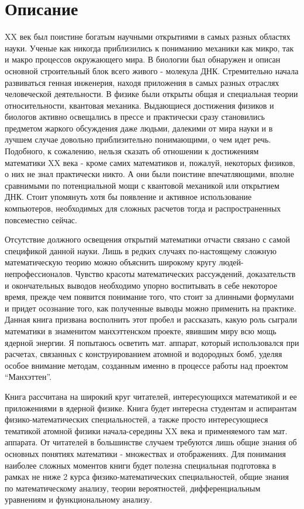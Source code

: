 \chapter*{Описание}

XX век был поистине богатым научными открытиями в самых разных областях науки. Ученые как никогда приблизились к пониманию механики как микро, так и макро процессов окружающего мира. В биологии был обнаружен и описан основной строительный блок всего живого - молекула ДНК. Стремительно начала развиваться генная инженерия, находя приложения в самых разных отраслях человеческой деятельности. В физике были открыты общая и специальная теории относительности, квантовая механика. Выдающиеся достижения физиков и биологов активно освещались в прессе и практически сразу становились предметом жаркого обсуждения даже людьми, далекими от мира науки и в лучшем случае довольно приблизительно понимающими, о чем идет речь. 
Подобного, к сожалению, нельзя сказать об отношении к достижениям математики XX века - кроме самих математиков и, пожалуй, некоторых физиков, о них не знал практически никто. А они были поистине впечатляющими, вполне сравнимыми по потенциальной мощи с квантовой механикой или открытием ДНК. Стоит упомянуть хотя бы появление и активное использование компьютеров, необходимых для сложных расчетов тогда и распространенных повсеместно сейчас.

Отсутствие должного освещения открытий математики отчасти связано с самой спецификой данной науки. Лишь в редких случаях по-настоящему сложную математическую теорию можно объяснить широкому кругу людей-непрофессионалов. Чувство красоты математических рассуждений, доказательств и окончательных выводов необходимо упорно воспитывать в себе некоторое время, прежде чем появится понимание того, что стоит за длинными формулами и придет осознание того, как полученные выводы можно применить на практике.
Данная книга призвана восполнить этот пробел и рассказать, какую роль сыграли математики в знаменитом манхэттенском проекте, явившим миру всю мощь ядерной энергии. Я попытаюсь осветить мат. аппарат, который использовался при расчетах, связанных с конструированием атомной и водородных бомб, уделяя особое внимание методам, созданным именно в процессе работы над проектом “Манхэттен”.

Книга рассчитана на широкий круг читателей, интересующихся математикой и ее приложениями в ядерной физике. Книга будет интересна студентам и аспирантам физико-математических специальностей, а также просто интересующиеся тематикой атомной физики начала-середины XX века и применяемого там мат. аппарата. От читателей в большинстве случаем требуются лишь общие знания об основных понятиях математики - множествах и отображениях. Для понимания наиболее сложных моментов книги будет полезна специальная подготовка в рамках не ниже 2 курса физико-математических специальностей, общие знания по математическому анализу, теории вероятностей, дифференциальным уравнениям и функциональному анализу.





